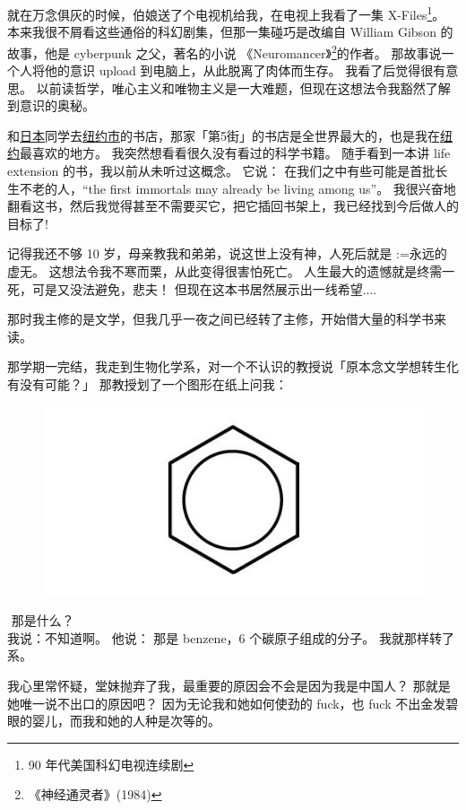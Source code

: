 \documentclass[12pt]{report}
\makeatletter
\newcommand{\tab}{\hspace*{1cm}}
\renewcommand{\d}[1]{$\underaccent{\scalebox{0.5}{\textbullet}}{\textrm{#1}}$}
\newcommand{\ds}[1]{%
  \@tfor\next:=#1\do{\d{\next}}}
\newcommand*\dashh{\textemdash\,\,}
\makeatother
\begin{document}
就在万念俱灰的时候，伯娘送了个电视机给我，在电视上我看了一集 X-Files\footnote{90 年代美国科幻电视连续剧}。 本来我很不屑看这些通俗的科幻剧集，但那一集碰巧是改编自 William Gibson 的故事，他是 cyberpunk 之父，著名的小说 《Neuromancer》\footnote{《神经通灵者》(1984)}的作者。 那故事说一个人将他的意识 upload 到电脑上，从此脱离了肉体而生存。 我看了后觉得很有意思。 以前读哲学，唯心主义和唯物主义是一大难题，但现在这想法令我豁然了解到意识的奥秘。 

和\uline{日本}同学去\uline{纽约市}的书店，那家「第5街」的书店是全世界最大的，也是我在\uline{纽约}最喜欢的地方。 我突然想看看很久没有看过的科学书籍。 随手看到一本讲 life extension 的书，我以前从未听过这概念。 它说： 在我们之中有些可能是首批长生不老的人，``the first immortals may already be living among us''。 我很兴奋地翻看这书，然后我觉得甚至不需要买它，把它插回书架上，我已经找到今后做人的目标了!

记得我还不够 10 岁，母亲教我和弟弟，说这世上没有神，人死后就是\ds{永远的虚无}。 这想法令我不寒而栗，从此变得很害怕死亡。 人生最大的遗憾就是终需一死，可是又没法避免，悲夫！  但现在这本书居然展示出一线希望....

那时我主修的是文学，但我几乎一夜之间已经转了主修，开始借大量的科学书来读。

那学期一完结，我走到生物化学系，对一个不认识的教授说「原本念文学想转生化有没有可能？」 那教授划了一个图形在纸上问我：
\begin{figure}[H]
\centering
\includegraphics[scale=0.4]{benzene.jpg}
\end{figure}
\vspace{-1cm}
\tab \dashh 那是什么？\\
我说：不知道啊。 他说： 那是 benzene，6 个碳原子组成的分子。  我就那样转了系。

我心里常怀疑，堂妹抛弃了我，最重要的原因会不会是因为我是中国人？ 那就是她唯一说不出口的原因吧？  因为无论我和她如何使劲的 fuck，也 fuck 不出金发碧眼的婴儿，而我和她的人种是次等的。
\end{document}
